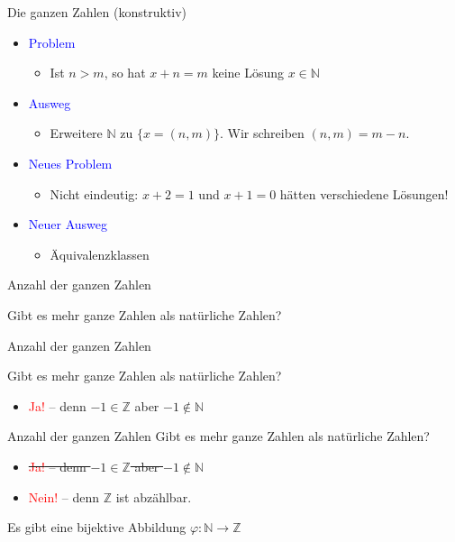 \documentclass[12pt%
,aspectratio=169%
]{beamer}
\begin{document}
\begin{frame}{Die ganzen Zahlen (konstruktiv)}
\begin{itemize}
	\item \textcolor{blue}{Problem}
	\begin{itemize}
		\item Ist $n > m$, so hat $x + n = m$ keine Lösung $x \in \mathbb{N}$
	\end{itemize}
	\item \textcolor{blue}{Ausweg}
	\begin{itemize}
		\item Erweitere $\mathbb{N}$ zu $\{x = (n, m)\}$. Wir schreiben $(n, m) = m - n$.
	\end{itemize}
	\item \textcolor{blue}{Neues Problem}
	\begin{itemize}
		\item Nicht eindeutig: $x + 2 = 1$ und $x + 1 = 0$ hätten verschiedene Lösungen!
	\end{itemize}
	\item \textcolor{blue}{Neuer Ausweg}
	\begin{itemize}
		\item Äquivalenzklassen 
	\end{itemize}
\end{itemize}
\end{frame}

\begin{frame}{Anzahl der ganzen Zahlen}
\begin{center}
	Gibt es mehr ganze Zahlen als natürliche Zahlen?
\end{center}
\end{frame}

\begin{frame}{Anzahl der ganzen Zahlen}
\begin{center}
	Gibt es mehr ganze Zahlen als natürliche Zahlen?
	\begin{itemize}
		\item \textcolor{red}{Ja!} -- denn $-1 \in \mathbb{Z}$ aber $-1 \not \in \mathbb{N}$
	\end{itemize}
\end{center}
\end{frame}

\begin{frame}{Anzahl der ganzen Zahlen}
	Gibt es mehr ganze Zahlen als natürliche Zahlen?
	\begin{itemize}
		\item \sout{\textcolor{red}{Ja!} -- denn $-1 \in \mathbb{Z}$ aber $-1 \not \in \mathbb{N}$}
		\item \textcolor{red}{Nein!} -- denn $\mathbb{Z}$ ist abzählbar.
	\end{itemize}
	Es gibt eine bijektive Abbildung $\varphi : \mathbb{N} \to \mathbb{Z}$
\end{frame}
\end{document}
